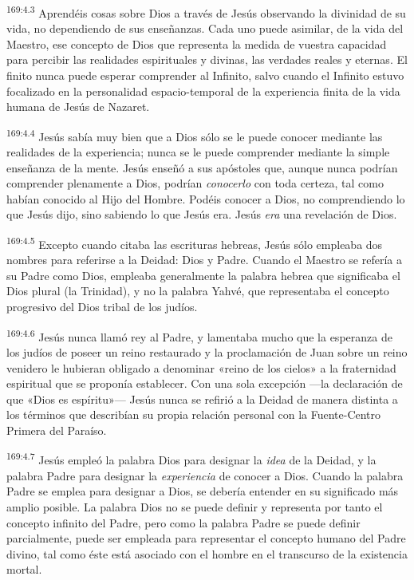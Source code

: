 \par 
\textsuperscript{169:4.3} Aprendéis cosas sobre Dios a través de Jesús observando la divinidad de su vida, no dependiendo de sus enseñanzas. Cada uno puede asimilar, de la vida del Maestro, ese concepto de Dios que representa la medida de vuestra capacidad para percibir las realidades espirituales y divinas, las verdades reales y eternas. El finito nunca puede esperar comprender al Infinito, salvo cuando el Infinito estuvo focalizado en la personalidad espacio-temporal de la experiencia finita de la vida humana de Jesús de Nazaret.

\par 
\textsuperscript{169:4.4} Jesús sabía muy bien que a Dios sólo se le puede conocer mediante las realidades de la experiencia; nunca se le puede comprender mediante la simple enseñanza de la mente. Jesús enseñó a sus apóstoles que, aunque nunca podrían comprender plenamente a Dios, podrían \textit{conocerlo} con toda certeza, tal como habían conocido al Hijo del Hombre. Podéis conocer a Dios, no comprendiendo lo que Jesús dijo, sino sabiendo lo que Jesús era. Jesús \textit{era} una revelación de Dios.

\par 
\textsuperscript{169:4.5} Excepto cuando citaba las escrituras hebreas, Jesús sólo empleaba dos nombres para referirse a la Deidad: Dios y Padre. Cuando el Maestro se refería a su Padre como Dios, empleaba generalmente la palabra hebrea que significaba el Dios plural (la Trinidad), y no la palabra Yahvé, que representaba el concepto progresivo del Dios tribal de los judíos.

\par 
\textsuperscript{169:4.6} Jesús nunca llamó rey al Padre, y lamentaba mucho que la esperanza de los judíos de poseer un reino restaurado y la proclamación de Juan sobre un reino venidero le hubieran obligado a denominar «reino de los cielos» a la fraternidad espiritual que se proponía establecer. Con una sola excepción ---la declaración de que «Dios es espíritu»--- Jesús nunca se refirió a la Deidad de manera distinta a los términos que describían su propia relación personal con la Fuente-Centro Primera del Paraíso.

\par 
\textsuperscript{169:4.7} Jesús empleó la palabra Dios para designar la \textit{idea} de la Deidad, y la palabra Padre para designar la \textit{experiencia} de conocer a Dios. Cuando la palabra Padre se emplea para designar a Dios, se debería entender en su significado más amplio posible. La palabra Dios no se puede definir y representa por tanto el concepto infinito del Padre, pero como la palabra Padre se puede definir parcialmente, puede ser empleada para representar el concepto humano del Padre divino, tal como éste está asociado con el hombre en el transcurso de la existencia mortal.

